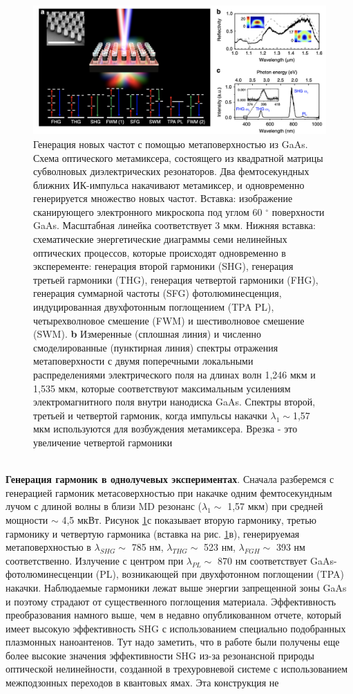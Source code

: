 \begin{figure}[h!]
	\centering
	\includegraphics[width=0.7\linewidth]{images/mixer.png}
	\caption{Генерация новых частот с помощью метаповерхностью из  GaAs. Схема оптического метамиксера, состоящего из квадратной матрицы субволновых диэлектрических резонаторов. Два фемтосекундных ближних ИК-импульса накачивают метамиксер, и одновременно генерируется множество новых частот. Вставка: изображение сканирующего электронного микроскопа под углом 60 $^\circ$ поверхности GaAs. Масштабная линейка соответствует 3 мкм. Нижняя вставка: схематические энергетические диаграммы семи нелинейных оптических процессов, которые происходят одновременно в эксперементе: генерация второй гармоники (SHG), генерация третьей гармоники (THG), генерация четвертой гармоники (FHG), генерация суммарной частоты (SFG) фотолюминесценция, индуцированная двухфотонным поглощением (TPA PL), четырехволновое смешение (FWM) и шестиволновое смешение (SWM). \textbf{b} Измеренные (сплошная линия) и численно смоделированные (пунктирная линия) спектры отражения метаповерхности с двумя поперечными локальными распределениями электрического поля на длинах волн 1,246 мкм и 1,535 мкм, которые соответствуют максимальным усилениям электромагнитного поля внутри нанодиска GaAs. Спектры второй, третьей и четвертой гармоник, когда импульсы накачки $\lambda_1 \sim $1,57 мкм используются для возбуждения метамиксера. Врезка - это увеличение четвертой гармоники}
	\label{mixerPictr1}
\end{figure}
\\
\hspace*{2mm}
\textbf{Генерация гармоник в однолучевых экспериментах}. Сначала разберемся с генерацией гармоник метасоверхностью при накачке одним фемтосекундным лучом с длиной волны в близи MD резонанс ($\lambda_1 \sim$ 1,57 мкм) при средней мощности $\sim$ 4,5 мкВт. Рисунок \ref{mixerPictr1}с показывает вторую гармонику, третью гармонику и четвертую гармоника (вставка на рис. \ref{mixerPictr1}в), генерируемая метаповерхностью в $\lambda_{SHG} \sim$ 785 нм, $\lambda_{THG} \sim$ 523 нм, $\lambda_{FGH} \sim$ 393 нм соответственно. Излучение с центром при $\lambda_{PL} \sim$ 870 нм соответствует GaAs-фотолюминесценции (PL), возникающей при двухфотонном поглощении (TPA) накачки. Наблюдаемые гармоники лежат выше энергии запрещенной зоны GaAs и поэтому страдают от существенного поглощения материала. Эффективность преобразования намного выше, чем в недавно опубликованном отчете, который имеет высокую эффективность SHG с использованием специально подобранных плазмонных наноантенов. Тут надо заметить, что в работе \cite{wolf2015phased} были получены еще более высокие значения эффективности SHG из-за резонансной природы оптической нелинейности, созданной в трехуровневой системе с использованием межподзонных переходов в квантовых ямах. Эта конструкция не 
